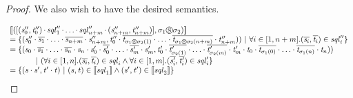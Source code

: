 \documentclass[acmsmall]{acmart}
\begin{document}
\begin{proof}
  We also wish to have the desired semantics.

  \[
    \begin{array}{l}
      \SemanticsOf{(\SequenceLensOf{(\String_0'',\StringAlt_0'') \SeqLSep \SequenceLens_1'' \SeqLSep 
      \ldots \SeqLSep 
      \SequenceLens_{n+m}'' \SeqLSep (\String_{n+m}'',\StringAlt_{n+m}'')},
      \SwapPermutationOf{\sigma_1}{\sigma_2})}\\
      = \SetOf{(\String_0''\Concat\overline{\String_1}\Concat
      \ldots\Concat\overline{\String_{n+m}}\Concat\String_{n+m}'',
      \StringAlt_0''\Concat\overline{\StringAlt_{\SwapPermutationOf{\sigma_1}{\sigma_2}(1)}}\Concat
      \ldots\Concat\overline{\StringAlt_{\SwapPermutationOf{\sigma_1}{\sigma_2}(n+m)}}\Concat\StringAlt_{n+m}''))\SuchThat
      \forall i\in\RangeIncInc{1}{n+m}.(\overline{\String_i},\overline{\StringAlt_i})\in\SequenceLens_i''}\\
      = \SetOf{(\String_0\Concat\overline{\String_1}\Concat\ldots\Concat
      \overline{\String_n}\Concat\String_n\Concat\String_0'\Concat\overline{\String_{0}'}\Concat
      \ldots\Concat\overline{\String_m'}\Concat\String_m',
      \StringAlt_0'\Concat\overline{\StringAlt_{\sigma_2(1)}'}\Concat\ldots\Concat
      \overline{\StringAlt_{\sigma_2(m)}'}\Concat\StringAlt_m'\Concat\StringAlt_0
      \Concat\overline{\StringAlt_{\sigma_1(0)}}\Concat
      \ldots\Concat\overline{\StringAlt_{\sigma_1(n)}}\Concat\StringAlt_n))\\
      \hspace*{3em}\SuchThat
      (\forall i\in\RangeIncInc{1}{n}.
      (\overline{\String_i},\overline{\StringAlt_i})\in\SequenceLens_i
      \BooleanAnd
      \forall i\in\RangeIncInc{1}{m}.
      (\overline{\String_i'},\overline{\StringAlt_i'})\in\SequenceLens_i'}\\
      = \SetOf{(\String\Concat\String',\StringAlt'\Concat\StringAlt)\SuchThat
      (\String,\StringAlt)\in\SemanticsOf{\SequenceLens_1}
      \BooleanAnd
      (\String',\StringAlt')\in\SemanticsOf{\SequenceLens_2}}
    \end{array}
  \]
\end{proof}
\end{document}
